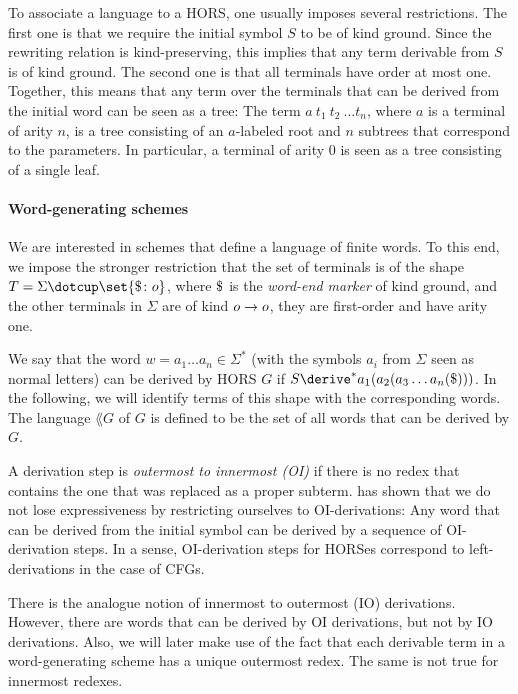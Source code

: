 \documentclass[../../diss.tex]{subfiles}
\begin{document}
To associate a language to a HORS, one usually imposes several restrictions.
The first one is that we require the initial symbol $S$ to be of kind ground.
Since the rewriting relation is kind-preserving, this implies that any term derivable from $S$ is of kind ground.
The second one is that all terminals have order at most one.
Together, this means that any term over the terminals that can be derived from the initial word can be seen as a tree:
The term $a\ t_1\ t_2\ \ldots t_n$, where $a$ is a terminal of arity $n$, is a tree consisting of an $a$-labeled root and $n$ subtrees that correspond to the parameters.
In particular, a terminal of arity $0$ is seen as a tree consisting of a single leaf.

\paragraph{Word-generating schemes}

We are interested in schemes that define a language of finite words.
To this end, we impose the stronger restriction that the set of terminals is of the shape $T = \Sigma \dotcup \set{ \wordend \colon \ground}$, where $\wordend$ is the \emph{word-end marker} of kind ground, and the other terminals in $\Sigma$ are of kind $o \to o$, \ie they are first-order and have arity one.

We say that the word $w = a_1 \ldots a_n \in \Sigma^*$ (with the symbols $a_i$ from $\Sigma$ seen as normal letters) can be derived by HORS $G$ if $S \derive^* a_1 (a_2 ( a_3 \ldots a_n(\wordend)))$.
In the following, we will identify terms of this shape with the corresponding words.
The language $\lang{G}$ of $G$ is defined to be the set of all words that can be derived by $G$.

A derivation step is \emph{outermost to innermost (OI)} if there is no redex that contains the one that was replaced as a proper subterm.
 has shown that we do not lose expressiveness by restricting ourselves to OI-derivations:
Any word that can be derived from the initial symbol can be derived by a sequence of OI-derivation steps.
In a sense, OI-derivation steps for HORSes correspond to left-derivations in the case of CFGs.

There is the analogue notion of innermost to outermost (IO) derivations.
However, there are words that can be derived by OI derivations, but not by IO derivations.
Also, we will later make use of the fact that each derivable term in a word-generating scheme has a unique outermost redex.
The same is not true for innermost redexes.
\end{document}
